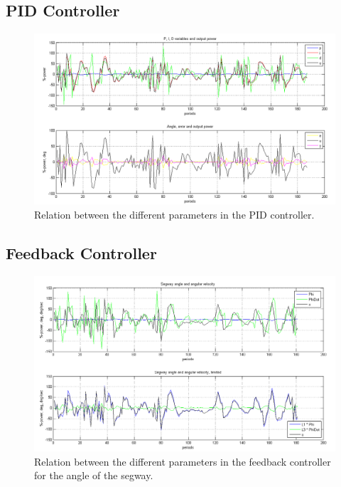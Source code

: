 \documentclass[a4paper]{article}
\begin{document}
\subsection{PID Controller}
\begin{figure}[H]
  \centering
\includegraphics[scale=0.47]{pic/pid.png}
\caption{Relation between the different parameters in the PID controller.}
\end{figure}

\subsection{Feedback Controller}
\begin{figure}[H]
  \centering
\includegraphics[scale=0.47]{pic/feedbackPlot.png}
\caption{Relation between the different parameters in the feedback controller for the angle of the segway.}
\end{figure}
\end{document}
